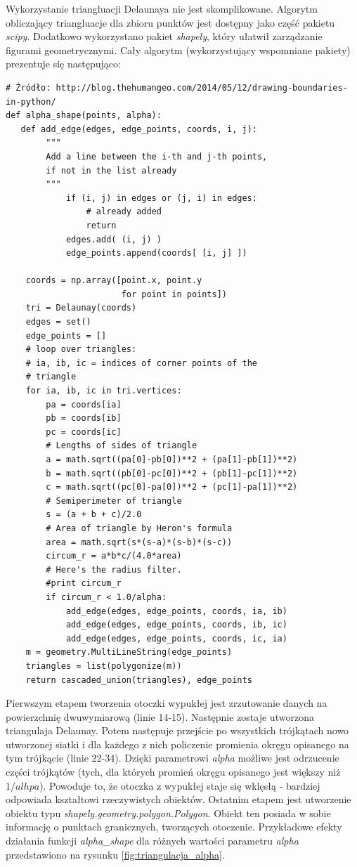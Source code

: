 Wykorzystanie triangluacji Delaunaya nie jest skomplikowane. Algorytm obliczający triangluacje
dla zbioru punktów jest dostępny jako część pakietu \textit{scipy}. Dodatkowo wykorzystano pakiet \textit{shapely},
który ułatwił zarządzanie figurami geometrycznymi. Cały algorytm (wykorzystujący wspomniane pakiety)
prezentuje się następująco:

\begin{lstlisting}
# Źródło: http://blog.thehumangeo.com/2014/05/12/drawing-boundaries-in-python/
def alpha_shape(points, alpha):
   def add_edge(edges, edge_points, coords, i, j):
        """
        Add a line between the i-th and j-th points,
        if not in the list already
        """
            if (i, j) in edges or (j, i) in edges:
                # already added
                return
            edges.add( (i, j) )
            edge_points.append(coords[ [i, j] ])

    coords = np.array([point.x, point.y
                       for point in points])
    tri = Delaunay(coords)
    edges = set()
    edge_points = []
    # loop over triangles:
    # ia, ib, ic = indices of corner points of the
    # triangle
    for ia, ib, ic in tri.vertices:
        pa = coords[ia]
        pb = coords[ib]
        pc = coords[ic]
        # Lengths of sides of triangle
        a = math.sqrt((pa[0]-pb[0])**2 + (pa[1]-pb[1])**2)
        b = math.sqrt((pb[0]-pc[0])**2 + (pb[1]-pc[1])**2)
        c = math.sqrt((pc[0]-pa[0])**2 + (pc[1]-pa[1])**2)
        # Semiperimeter of triangle
        s = (a + b + c)/2.0
        # Area of triangle by Heron's formula
        area = math.sqrt(s*(s-a)*(s-b)*(s-c))
        circum_r = a*b*c/(4.0*area)
        # Here's the radius filter.
        #print circum_r
        if circum_r < 1.0/alpha:
            add_edge(edges, edge_points, coords, ia, ib)
            add_edge(edges, edge_points, coords, ib, ic)
            add_edge(edges, edge_points, coords, ic, ia)
    m = geometry.MultiLineString(edge_points)
    triangles = list(polygonize(m))
    return cascaded_union(triangles), edge_points 
\end{lstlisting}

Pierwszym etapem tworzenia otoczki wypukłej jest zrzutowanie danych na powierzchnię dwuwymiarową (linie 14-15).
Następnie zostaje utworzona triangulaja Delaunay. Potem następuje przejście po wszystkich trójkątach nowo
utworzonej siatki i dla każdego z nich policzenie promienia okręgu opisanego na tym trójkącie (linie 22-34). Dzięki
parametrowi \textit{alpha} możliwe jest odrzucenie części trójkątów (tych, dla których promień okręgu opisanego jest większy niż $1/alhpa$).
Powoduje to, że otoczka z wypukłej staje się wklęsłą - bardziej odpowiada kształtowi rzeczywistych obiektów.
Ostatnim etapem jest utworzenie obiektu typu \textit{shapely.geometry.polygon.Polygon}. Obiekt ten posiada w sobie informację
o punktach granicznych, tworzących otoczenie. Przykładowe efekty działania funkcji \textit{alpha\_shape} dla różnych wartości 
parametru \textit{alpha} przedstawiono na rysunku \ref{fig:triangulacja_alpha}.


